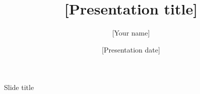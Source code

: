 \documentclass[aspectratio=169,11pt]{beamer}
\title{[Presentation title]}
\author{[Your name]}
\institute{[Department] \\ {[University]}}
\date{[Presentation date]}
\begin{document}
\begin{frame}
  \titlepage
\end{frame}

\begin{frame}{Slide title}
\end{frame}
\end{document}
